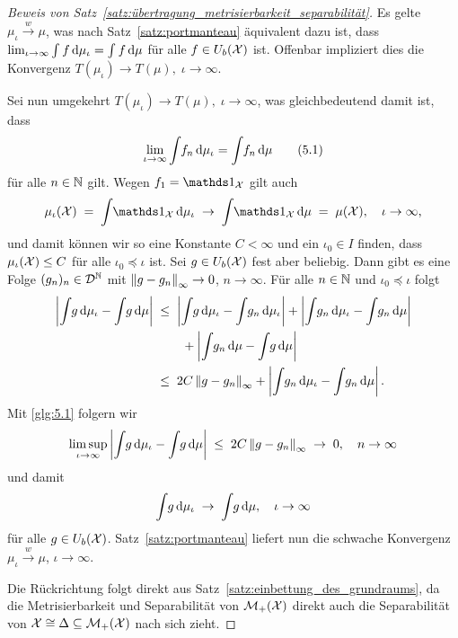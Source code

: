 \documentclass[../thesis/thesis.tex]{subfiles}
\begin{document}
\begin{proof}[Beweis von Satz~\ref{satz:übertragung_metrisierbarkeit_separabilität}]
		Es gelte $\mu_\iota \xrightarrow{w} \mu$, was nach Satz~\ref{satz:portmanteau} äquivalent dazu ist, dass $\lim_{\iota \to \infty} \int_{} \, f \, \mathrm{d}\mu_\iota = \int_{} \, f \, \mathrm{d}\mu$ für alle 
		$f \in U_b(\mathcal{X})$ ist. Offenbar impliziert dies die Konvergenz $T(\mu_\iota) \to T(\mu), \; \iota \to \infty$.
		
		Sei nun umgekehrt $T(\mu_\iota) \to T(\mu), \; \iota \to \infty$, was gleichbedeutend damit ist, dass 
		\[ \lim_{\iota \to \infty} \int_{} \, f_n \, \mathrm{d}\mu_\iota = \int_{} \, f_n \, \mathrm{d}\mu \label{glg:5.1} \tag{5.1} \] 
		für alle $n \in \mathbb{N}$ gilt.
		Wegen $f_1 = \indfct_\X$ gilt auch
		\[ \mu_\iota(\X) \; = \; \measureint{}{\indfct_\X}{\mu_\iota} \; \to \; \measureint{}{\indfct_\X}{\mu} \; = \; \mu(\X), \quad \iota \to \infty \text{,} \]
		und damit können wir so eine Konstante $C < \infty$ und ein $\iota_0 \in I$ finden, dass $\mu_\iota(\mathcal{X}) \leq C$ für alle $\iota_0 \preceq \iota$ ist.
		Sei $g \in U_b(\mathcal{X})$ fest aber beliebig. Dann gibt es eine Folge $(g_n)_n \in \mathcal{D}^{\mathbb{N}}$ mit $\left\lVert g - g_n\right\rVert_\infty \to 0$, $n \to \infty$. Für alle $n \in \mathbb{N}$ und $\iota_0 \preceq \iota$ folgt
		\begin{align*}
			\left| \int_{} \, g \, \mathrm{d}\mu_\iota - \int_{} \, g \, \mathrm{d}\mu \right| \; &\leq \; 
			\left| \int_{} \, g \, \mathrm{d}\mu_\iota - \int_{} \, g_n \, \mathrm{d}\mu_\iota \right| + 
			\left| \int_{} \, g_n \, \mathrm{d}\mu_\iota - \int_{} \, g_n \, \mathrm{d}\mu \right| \\
			& \qquad + 
			\left| \int_{} \, g_n \, \mathrm{d}\mu - \int_{} \, g \, \mathrm{d}\mu \right| \\
			&\leq \; 2 C \left\lVert g - g_n\right\rVert_\infty + \left| \int_{} \, g_n \, \mathrm{d}\mu_\iota - 
			\int_{} \, g_n \, \mathrm{d}\mu \right| \text{.}
		\end{align*}
		Mit \eqref{glg:5.1} folgern wir
		\[ \limsup_{\iota \to \infty} \left| \int_{} \, g \, \mathrm{d}\mu_\iota - \int_{} \, g \, \mathrm{d}\mu \right| \; \leq \; 2 C \left\lVert g - g_n\right\rVert_\infty \; \to \; 0, \quad n \to \infty \]
		und damit 
		\[ \int_{} \, g \, \mathrm{d}\mu_\iota \; \to \; \int_{} \, g \, \mathrm{d}\mu, \quad \iota \to \infty \]
		für alle $g \in U_b(\mathcal{X})$. Satz~\ref{satz:portmanteau} liefert nun die schwache Konvergenz $\mu_\iota \xrightarrow{w} \mu$, $\iota \to \infty$.
		
		Die Rückrichtung folgt direkt aus Satz~\ref{satz:einbettung_des_grundraums}, da die Metrisierbarkeit und Separabilität von $\mathcal{M}_{+}(\mathcal{X})$ direkt auch die Separabilität von $\mathcal{X} \cong \Delta \subseteq \mathcal{M}_{+}(\mathcal{X})$ nach sich zieht.
	\end{proof}
\end{document}
